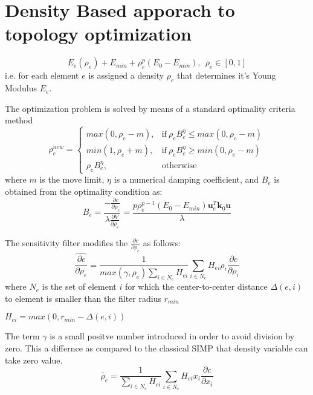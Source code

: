 \documentclass{article}
\begin{document}
\section{Density Based apporach to topology optimization}
\begin{equation*}
    E_{e}(\rho_e) + E_{min} + \rho_{e}^p(E_0 - E_{min}), \ \  \rho_e \in [0,1]
\end{equation*}
i.e. for each element $e$ is assigned a density $\rho_e$ that determines it's Young Modulus $E_e$.

The optimization problem is solved by means of a standard optimality criteria method
\begin{equation*}
    \rho_{e}^{new}=
    \begin{cases}
        max(0, \rho_{e}-m), & \text{if} \ \rho_{e}B_{e}^{\eta}\leq max(0, \rho_{e}-m)  \\
        min(1, \rho_{e}+m), & \text{if} \ \rho_{e}B_{e}^{\eta}\geq min(0, \rho_{e}-m) \\
        \rho_{e}B_{e}^{\eta}, & \text{otherwise}
    \end{cases}
\end{equation*}
where $m$ is the move limit, $\eta$ is a numerical damping coefficient, and $B_e$ is obtained from the optimality condition as:
\begin{equation*}
    B_e = \frac{-\frac{\partial c}{\partial \rho_e}}{\lambda\frac{\partial V}{\partial \rho_e}} = \frac{p\rho_{e}^{p-1}(E_0 - E_{min})\bm{u}_{e}^T\bm{k}_0\bm{u}}{\lambda}
\end{equation*}

The sensitivity filter modifies the $\frac{\partial c}{\partial \rho_e}$ as follows:
\begin{equation*}
    \widehat{\frac{\partial c}{\partial \rho_e}} = \frac{1}{max(\gamma, \rho_e)\sum_{i\in N_e}H_{ei}}\sum_{i \in N_e}H_{ei}\rho_{i}\frac{\partial c}{\partial \rho_i}
\end{equation*}
where $N_e$ is the set of element $i$ for which the center-to-center distance $\Delta(e,i)$ to element is smaller than the filter radius $r_{min}$

$H_{ei} = max(0,r_{min}-\Delta(e,i))$

The term $\gamma$ is a small positve number introduced in order to avoid division by zero. This a differnce as compared to the classical SIMP that density variable can take zero value.
\begin{equation*}
    \tilde{\rho_e} = \frac{1}{\sum_{i\in N_e}H_{ei}}\sum_{i \in N_e}H_{ei}x_i\frac{\partial c}{\partial x_i}
\end{equation*}
\end{document}
